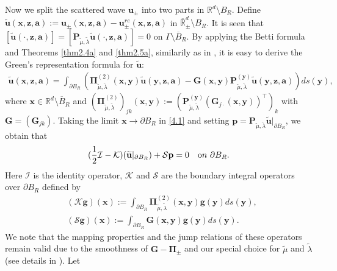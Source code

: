\documentclass[final,reqno]{siamltex}
\newcommand{\pa}{\partial}
\newcommand{\ov}{\overline}
\newcommand{\wid}{\widetilde}
\newcommand{\mat}{\mathbb}
\newcommand{\R}{{\mat R}}
\begin{document}
Now we split the scattered wave $\mathbf{u}_\pm$ into two parts in $\R^d\setminus B_R$. Define $\mathbf{\wid u}(\mathbf{x},\mathbf{z},\mathbf{a}):=\mathbf{u}_\pm(\mathbf{x},\mathbf{z},\mathbf{a})-\mathbf{u}^{re}_\pm(\mathbf{x},\mathbf{z},\mathbf{a})$ in $\ov\R^d_\pm\setminus B_R$. It is seen that $[\mathbf{\wid u}(\cdot,\mathbf{z},\mathbf{a})]=[\mathbf{P}_{\tilde{\mu},\tilde{\lambda}}\mathbf{\wid u}(\cdot,\mathbf{z},\mathbf{a})]=0$ on $\Gamma\setminus\ov B_R$. By applying the Betti formula and Theorems \ref{thm2.4a} and \ref{thm2.5a}, similarily as in \cite{GXY18,PH98,VD79}, it is easy to derive the Green's representation formula for $\mathbf{\wid u}$: 
\begin{align}\label{4.1}
  \mathbf{\wid u}(\mathbf{x},\mathbf{z},\mathbf{a})=\int_{\pa B_R}\left(\boldsymbol{\Pi}^{(2)}_{\tilde{\mu},\tilde{\lambda}}(\mathbf{x},\mathbf{y})\mathbf{\wid u}(\mathbf{y},\mathbf{z},\mathbf{a})-\mathbf{G}(\mathbf{x},\mathbf{y})\mathbf{P}_{\tilde{\mu},\tilde{\lambda}}^{(\mathbf{y})}\mathbf{\wid u}(\mathbf{y},\mathbf{z},\mathbf{a})\right)ds(\mathbf{y}),~~~
\end{align}
where $\mathbf{x}\in\R^d\setminus\ov B_R$ and  $(\boldsymbol{\Pi}^{(2)}_{\tilde{\mu},\tilde{\lambda}})_{jk}(\mathbf{x},\mathbf{y}):=(\mathbf{P}_{\tilde{\mu},\tilde{\lambda}}^{(\mathbf{y})}(\mathbf{G}_{j\cdot}(\mathbf{x},\mathbf{y}))^\top)_k$ with $\mathbf{G}=(\mathbf{G}_{jk})$. Taking the limit $\mathbf{x}\rightarrow\pa B_R$ in \eqref{4.1} and setting $\mathbf{p}=\mathbf{P}_{\tilde{\mu},\tilde{\lambda}}\mathbf{\wid u}|_{\pa B_R}$, we obtain that 
\begin{align}\label{4.2}
  (\frac{1}{2}\mathcal{I}-\mathcal{K})(\mathbf{\wid u}|_{\pa B_R})+\mathcal{S}\mathbf{p}=0~~~{\text on}~\pa B_R. 
\end{align}
Here $\mathcal{I}$ is the identity operator, $\mathcal{K}$ and $\mathcal{S}$ are the boundary integral operators over $\pa B_R$ defined by 
\begin{align*}
 &( \mathcal{K}\mathbf{g})(\mathbf{x}):=\int_{\pa B_R}\boldsymbol{\Pi}_{\tilde{\mu},\tilde{\lambda}}^{(2)}(\mathbf{x},\mathbf{y})\mathbf{g}(\mathbf{y})ds(\mathbf{y}), \\ 
 &(\mathcal{S}\mathbf{g})(\mathbf{x}):=\int_{\pa B_R}\mathbf{G}(\mathbf{x},\mathbf{y})\mathbf{g}(\mathbf{y})ds(\mathbf{y}). 
\end{align*}
We note that the mapping properties and the jump relations of these operators remain valid due to the smoothness of $\mathbf{G}-\boldsymbol{\Pi}_\pm$ and our special choice for $\tilde{\mu}$ and $\tilde{\lambda}$ (see details in \cite{GXY18,WM10,VD79}). Let 
\end{document}
